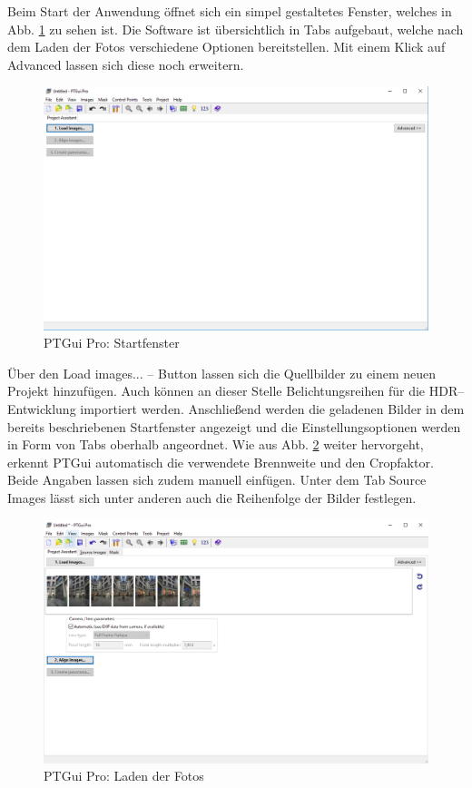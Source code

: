 \documentclass[liststotoc,bibtotoc,fontsize=14pt,]{scrreprt}
\begin{document}
	Beim Start der Anwendung öffnet sich ein simpel gestaltetes Fenster, welches in Abb. \ref{img:ptgui_step_1} zu sehen ist. Die Software ist übersichtlich in Tabs aufgebaut, welche nach dem Laden der Fotos verschiedene Optionen bereitstellen. Mit einem Klick auf \grqq{}Advanced\grqq{} lassen sich diese noch erweitern.
	\begin{figure}[H]
		\includegraphics[width=\linewidth]{img/steps/PTGui_Step_1.PNG}
		\caption{PTGui Pro: Startfenster}
		\label{img:ptgui_step_1}
	\end{figure}
	\bigskip
	Über den \grqq{}Load images... -- Button\grqq{} lassen sich die Quellbilder zu einem neuen Projekt hinzufügen. Auch können an dieser Stelle Belichtungsreihen für die HDR--Entwicklung importiert werden. Anschließend werden die geladenen Bilder in dem bereits beschriebenen Startfenster angezeigt und die Einstellungsoptionen werden in Form von Tabs oberhalb angeordnet. Wie aus Abb. \ref{img:ptgui_step_2} weiter hervorgeht, erkennt PTGui automatisch die verwendete Brennweite und den Cropfaktor. Beide Angaben lassen sich zudem manuell einfügen. Unter dem Tab \grqq{}Source Images\grqq{} lässt sich unter anderen auch die Reihenfolge der Bilder festlegen.
	\begin{figure}[H]
		\includegraphics[width=\linewidth]{img/steps/PTGui_Step_2.PNG}
		\caption{PTGui Pro: Laden der Fotos}
		\label{img:ptgui_step_2}
	\end{figure}
\end{document}
